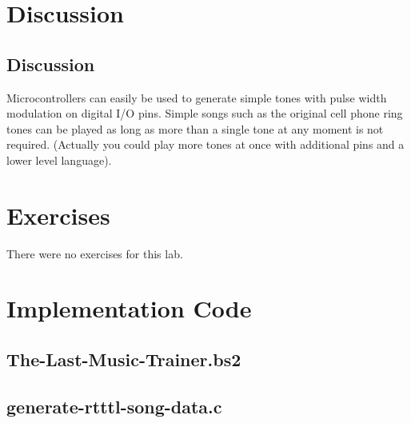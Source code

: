 \documentclass[11pt]{article}
\begin{document}
\section{Discussion}

\subsection{Discussion}

Microcontrollers can easily be used to generate simple tones with
pulse width modulation on digital I/O pins.
Simple songs such as the original cell phone ring tones can be played
as long as more than a single tone at any moment is not required.
(Actually you could play more tones at once with additional pins
and a lower level language).

\section{Exercises}

There were no exercises for this lab.

\clearpage

\section{Implementation Code}

\subsection{The-Last-Music-Trainer.bs2}

\begingroup
\fontsize{10pt}{12pt}

\endgroup

\clearpage
\subsection{generate-rtttl-song-data.c}
\label{generate-rtttl-songs-section}


\end{document}
